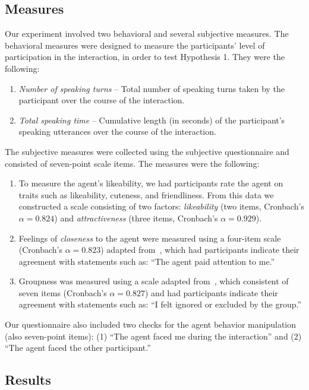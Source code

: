 \subsection{Measures}

Our experiment involved two behavioral and several subjective measures. The behavioral measures were designed to measure the participants' level of participation in the interaction, in order to test Hypothesis 1. They were the following:

\begin{enumerate}
\item \emph{Number of speaking turns} -- Total number of speaking turns taken by the participant over the course of the interaction.
\item \emph{Total speaking time} -- Cumulative length (in seconds) of the participant's speaking utterances over the course of the interaction.
\end{enumerate}

The subjective measures were collected using the subjective questionnaire and consisted of seven-point scale items. The measures were the following:
 
\begin{enumerate}
\item To measure the agent's likeability, we had participants rate the agent on traits such as likeability, cuteness, and friendliness. From this data we constructed a scale consisting of two factors: \emph{likeability} (two items, Cronbach's $\alpha = 0.824$) and \emph{attractiveness} (three items, Cronbach's $\alpha = 0.929$).
\item Feelings of \emph{closeness} to the agent were measured using a four-item scale (Cronbach's $\alpha = 0.823$) adapted from~\citep{aron1992inclusion}, which had participants indicate their agreement with statements such as: ``The agent paid attention to me.''
\item Groupness was measured using a scale adapted from~\citep{williams2000cyberostracism}, which consistent of seven items (Cronbach's $\alpha = 0.827$) and had participants indicate their agreement with statements such as: ``I felt ignored or excluded by the group.''
\end{enumerate}

Our questionnaire also included two checks for the agent behavior manipulation (also seven-point items): (1) ``The agent faced me during the interaction'' and (2) ``The agent faced the other participant.''

\subsection{Results}

